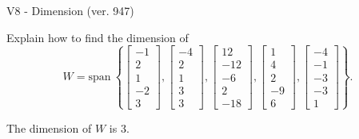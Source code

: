 \begin{exercise}
  \begin{exerciseTitle}V8 - Dimension (ver. 947)\end{exerciseTitle}
  \begin{exerciseStatement}
    Explain how to find the dimension of 
\[W=\mathrm{span}\ \left\{\left[\begin{array}{r}
-1 \\
2 \\
1 \\
-2 \\
3
\end{array}\right] , \left[\begin{array}{r}
-4 \\
2 \\
1 \\
3 \\
3
\end{array}\right] , \left[\begin{array}{r}
12 \\
-12 \\
-6 \\
2 \\
-18
\end{array}\right] , \left[\begin{array}{r}
1 \\
4 \\
2 \\
-9 \\
6
\end{array}\right] , \left[\begin{array}{r}
-4 \\
-1 \\
-3 \\
-3 \\
1
\end{array}\right]\right\}.\]



  \end{exerciseStatement}
  \begin{exerciseAnswer}
   The dimension of \(W\) is  \(3\).
  


  \end{exerciseAnswer}
\end{exercise}